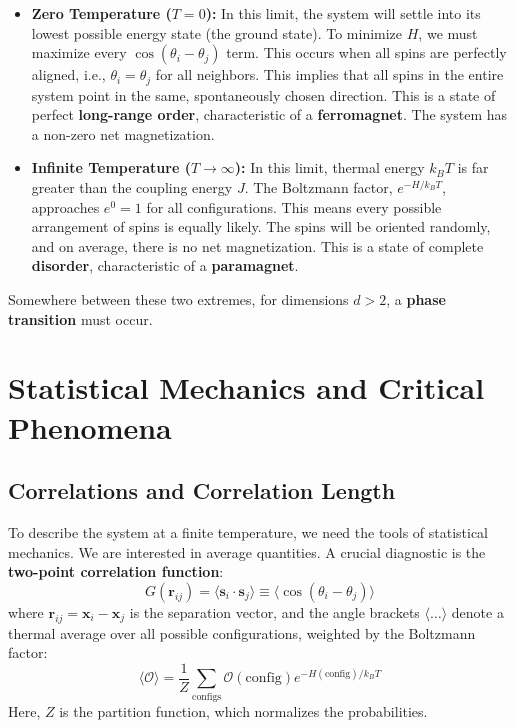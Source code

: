 \documentclass[11pt, a4paper, article]{article}
\renewcommand{\vec}[1]{\bm{#1}} %
\begin{document}
\begin{itemize}
    \item \textbf{Zero Temperature ($T=0$):} In this limit, the system will settle into its lowest possible energy state (the ground state). To minimize $H$, we must maximize every $\cos(\theta_i - \theta_j)$ term. This occurs when all spins are perfectly aligned, i.e., $\theta_i = \theta_j$ for all neighbors. This implies that all spins in the entire system point in the same, spontaneously chosen direction. This is a state of perfect \textbf{long-range order}, characteristic of a \textbf{ferromagnet}. The system has a non-zero net magnetization.

    \item \textbf{Infinite Temperature ($T \to \infty$):} In this limit, thermal energy $k_B T$ is far greater than the coupling energy $J$. The Boltzmann factor, $e^{-H/k_B T}$, approaches $e^0 = 1$ for all configurations. This means every possible arrangement of spins is equally likely. The spins will be oriented randomly, and on average, there is no net magnetization. This is a state of complete \textbf{disorder}, characteristic of a \textbf{paramagnet}.
\end{itemize}

Somewhere between these two extremes, for dimensions $d > 2$, a \textbf{phase transition} must occur.

\newpage
\section{Statistical Mechanics and Critical Phenomena}

\subsection{Correlations and Correlation Length}
To describe the system at a finite temperature, we need the tools of statistical mechanics. We are interested in average quantities. A crucial diagnostic is the \textbf{two-point correlation function}:
\begin{equation}
    G(\vec{r}_{ij}) = \langle \vec{s}_i \cdot \vec{s}_j \rangle \equiv \langle \cos(\theta_i - \theta_j) \rangle
\end{equation}
where $\vec{r}_{ij} = \vec{x}_i - \vec{x}_j$ is the separation vector, and the angle brackets $\langle \dots \rangle$ denote a thermal average over all possible configurations, weighted by the Boltzmann factor:
\begin{equation}
    \langle \mathcal{O} \rangle = \frac{1}{Z} \sum_{\text{configs}} \mathcal{O}(\text{config}) e^{-H(\text{config})/k_B T}
\end{equation}
Here, $Z$ is the partition function, which normalizes the probabilities.
\end{document}
